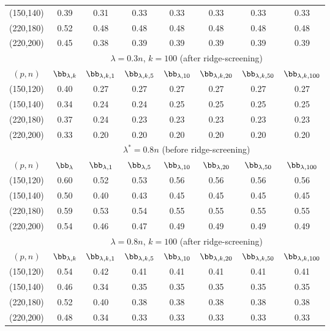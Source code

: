 {{\begin{table}[htp]
{\begin{center}
\begin{tabular}{cccccccc}
(150,140)&0.39& 0.31& 0.33& 0.33& 0.33& 0.33& 0.33\\
(220,180)&0.52 &0.48& 0.48& 0.48& 0.48 &0.48 &0.48\\
(220,200)&0.45 &0.38 &0.39& 0.39 &0.39& 0.39& 0.39\\
\midrule
&\multicolumn{7}{c}{$\lambda=0.3n$, $k=100$ (after ridge-screening)}\\
\cline{2-8}
$(p,n)$&$\bb_{\lambda,k}$&$\bb_{\lambda,k,1}$&$\bb_{\lambda,k,5}$&$\bb_{\lambda,10}$&$\bb_{\lambda,k,20}$&$\bb_{\lambda,k,50}$&$\bb_{\lambda,k,100}$\\
\hline
(150,120)&0.40& 0.27& 0.27& 0.27 &0.27& 0.27 &0.27\\
(150,140)&0.34& 0.24 &0.24 &0.25& 0.25& 0.25& 0.25\\
(220,180)& 0.37& 0.24 &0.23& 0.23& 0.23& 0.23& 0.23\\
(220,200)&0.33& 0.20& 0.20 &0.20 &0.20& 0.20 &0.20\\
\midrule
\midrule
&\multicolumn{7}{c}{$\lambda^*=0.8n$ (before ridge-screening)}\\
\cline{2-8}
$(p,n)$&$\bb_{\lambda}$&$\bb_{\lambda,1}$&$\bb_{\lambda,5}$&$\bb_{\lambda,10}$&$\bb_{\lambda,20}$&$\bb_{\lambda,50}$&$\bb_{\lambda,100}$\\
\hline
(150,120)&0.60 &0.52& 0.53& 0.56& 0.56& 0.56 &0.56\\
(150,140)&0.50& 0.40& 0.43& 0.45& 0.45& 0.45& 0.45\\
(220,180)&0.59 &0.53& 0.54& 0.55& 0.55 &0.55 &0.55\\
(220,200)&0.54 &0.46 &0.47& 0.49 &0.49& 0.49& 0.49\\
\midrule
&\multicolumn{7}{c}{$\lambda=0.8n$, $k=100$ (after ridge-screening)}\\
\cline{2-8}
$(p,n)$&$\bb_{\lambda,k}$&$\bb_{\lambda,k,1}$&$\bb_{\lambda,k,5}$&$\bb_{\lambda,10}$&$\bb_{\lambda,k,20}$&$\bb_{\lambda,k,50}$&$\bb_{\lambda,k,100}$\\
\hline
(150,120)&0.54& 0.42& 0.41& 0.41 &0.41& 0.41 &0.41\\
(150,140)&0.46& 0.34 &0.35 &0.35& 0.35& 0.35& 0.35\\
(220,180)& 0.52& 0.40 &0.38& 0.38& 0.38& 0.38& 0.38\\
(220,200)&0.48& 0.34& 0.33&0.33 &0.33& 0.33 &0.33\\
\bottomrule
\end{tabular}
  \end{center}}
\end{table}

}}
